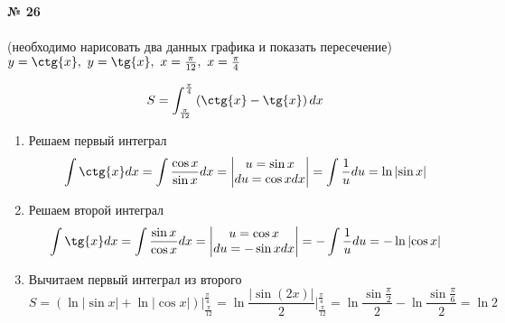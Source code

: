 \documentclass{article}
\begin{document}
\textbf{№ 26} 
\Large
\\
\\
(необходимо нарисовать два данных графика и показать пересечение) \\
$ y = \ctg{x}, \ y = \tg{x}, \ x = \frac{\pi}{12}, \ x = \frac{\pi}{4} $

$$ S 
= \int_{\frac{\pi}{12}}^{\frac{\pi}{4}} \left( \ctg{x} - \tg{x} \right)dx $$

\begin{enumerate}
\item Решаем первый интеграл
$$ \int \ctg{x} dx 
= \int \frac{\cos{x}}{\sin{x}}dx
= \begin{vmatrix} u = \sin{x} \\
                 du = \cos{x} dx \end{vmatrix}
= \int \frac{1}{u}du
= \ln{\left| \sin{x} \right|} $$

\item Решаем второй интеграл
$$ \int \tg{x} dx 
= \int \frac{\sin{x}}{\cos{x}}dx
= \begin{vmatrix} u = \cos{x} \\
                 du = -\sin{x} dx \end{vmatrix}
= -\int \frac{1}{u}du
= -\ln{\left| \cos{x} \right|} $$

\item Вычитаем первый интеграл из второго
$$ S = \left( \ln{\left| \sin{x} \right|} + \ln{\left| \cos{x} \right|} \right) \bigg\vert_{\frac{\pi}{12}}^{\frac{\pi}{4}} 
= \ln{ \frac{\left| \sin{(2x)} \right|}{2} } \bigg\vert_{\frac{\pi}{12}}^{\frac{\pi}{4}} 
= \ln{\frac{\sin{\frac{\pi}{2}}}{2}} - \ln{\frac{\sin{\frac{\pi}{6}}}{2}} 
= \ln{2} $$

\end{enumerate}
\end{document}
